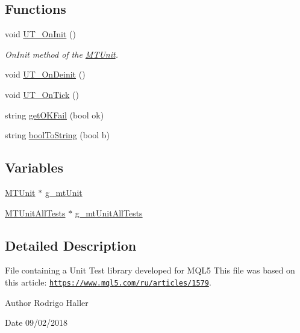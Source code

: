 \subsection*{Functions}
\begin{DoxyCompactItemize}
\item 
void \mbox{\hyperlink{_m_t_unit_8mqh_a9cdc57544d91884fab6f627b3394326f}{U\+T\+\_\+\+On\+Init}} ()
\begin{DoxyCompactList}\small\item\em On\+Init method of the \mbox{\hyperlink{class_m_t_unit}{M\+T\+Unit}}. \end{DoxyCompactList}\item 
void \mbox{\hyperlink{_m_t_unit_8mqh_a9fbaaa20ba4e1624e348f7ab5109ecbf}{U\+T\+\_\+\+On\+Deinit}} ()
\item 
void \mbox{\hyperlink{_m_t_unit_8mqh_afcdc18c227067029c1bb10f935bdb21c}{U\+T\+\_\+\+On\+Tick}} ()
\item 
string \mbox{\hyperlink{_m_t_unit_8mqh_a560d9b8bdbe896abd079b6c9d7bd107f}{get\+O\+K\+Fail}} (bool ok)
\item 
string \mbox{\hyperlink{_m_t_unit_8mqh_a846b4d0b246628bc40f57371459bdf2f}{bool\+To\+String}} (bool b)
\end{DoxyCompactItemize}
\subsection*{Variables}
\begin{DoxyCompactItemize}
\item 
\mbox{\hyperlink{class_m_t_unit}{M\+T\+Unit}} $\ast$ \mbox{\hyperlink{_m_t_unit_8mqh_a26846c3d9a3b28dcdfd39654d4527685}{g\+\_\+mt\+Unit}}
\item 
\mbox{\hyperlink{class_m_t_unit_all_tests}{M\+T\+Unit\+All\+Tests}} $\ast$ \mbox{\hyperlink{_m_t_unit_8mqh_af8a46b5767cc8d41db82ddc69eb9f46e}{g\+\_\+mt\+Unit\+All\+Tests}}
\end{DoxyCompactItemize}


\subsection{Detailed Description}
File containing a Unit Test library developed for M\+Q\+L5 This file was based on this article\+: \href{https://www.mql5.com/ru/articles/1579}{\tt https\+://www.\+mql5.\+com/ru/articles/1579}. 

\begin{DoxyAuthor}{Author}
Rodrigo Haller 
\end{DoxyAuthor}
\begin{DoxyDate}{Date}
09/02/2018 
\end{DoxyDate}


